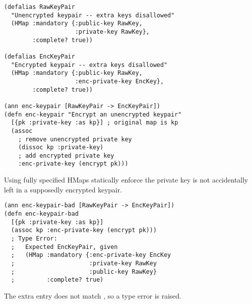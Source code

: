 \begin{exmp}
\begin{verbatim}
(defalias RawKeyPair
  "Unencrypted keypair -- extra keys disallowed"
  (HMap :mandatory {:public-key RawKey,
                    :private-key RawKey},
        :complete? true))

(defalias EncKeyPair
  "Encrypted keypair -- extra keys disallowed"
  (HMap :mandatory {:public-key RawKey,
                    :enc-private-key EncKey},
        :complete? true))

(ann enc-keypair [RawKeyPair -> EncKeyPair])
(defn enc-keypair "Encrypt an unencrypted keypair"
  [{pk :private-key :as kp}] ; original map is kp
  (assoc 
    ; remove unencrypted private key
    (dissoc kp :private-key)
    ; add encrypted private key
    :enc-private-key (encrypt pk)))
\end{verbatim}
\label{example:circleci}
\end{exmp}

Using fully specified HMaps
statically enforce the private key is not accidentally left in a supposedly
encrypted keypair.

\begin{verbatim}
(ann enc-keypair-bad [RawKeyPair -> EncKeyPair])
(defn enc-keypair-bad
  [{pk :private-key :as kp}]
  (assoc kp :enc-private-key (encrypt pk)))
  ; Type Error:
  ;   Expected EncKeyPair, given 
  ;   (HMap :mandatory {:enc-private-key EncKey
  ;                     :private-key RawKey
  ;                     :public-key RawKey}
  ;         :complete? true)
\end{verbatim}
The extra  entry does not match , so a type error
is raised.


